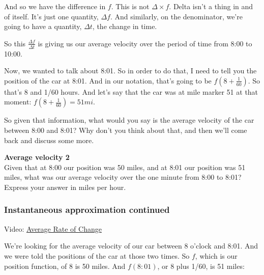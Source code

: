 \documentclass[pdftex, brazil, 12pt, twoside]{article}
\begin{document}
\begin{figure}[H]
  \begin{center}
  \end{center}
\end{figure}

And so we have the difference in $f$.
This is not $\Delta \times f$.
Delta isn't a thing in and of itself.
It's just one quantity, $\Delta f$.
And similarly, on the denominator,
we're going to have a quantity, $\Delta t$, the change in time.

So this $\displaystyle \frac{\Delta f}{\Delta t}$
is giving us our average velocity over the period
of time from 8:00 to 10:00.

Now, we wanted to talk about 8:01.
So in order to do that, I need to tell you the position
of the car at 8:01.
And in our notation, that's going to be $f(8 + \frac{1}{60})$.
So that's 8 and 1/60 hours.
And let's say that the car was at mile marker 51
at that moment: $f(8 + \frac{1}{60})=51 mi$.

So given that information, what would you say
is the average velocity of the car between 8:00 and 8:01?
Why don't you think about that, and then
we'll come back and discuss some more.

\begin{exercise}
  \textbf{Average velocity 2}\\%
  Given that at 8:00 our position was 50 miles,
  and at 8:01 our position was 51 miles, what was our average velocity over
  the one minute from 8:00 to 8:01? Express your answer in miles per hour.
\end{exercise}

\subsubsection{Instantaneous approximation continued}
\label{u1-what-inst-cont}

Video: \href{https://www.youtube.com/watch?v=d0OvM9uJ\_GY}{Average Rate of Change}

We're looking for the average velocity of our car
between 8 o'clock and 8:01.
And we were told the positions of the car at those two times.
So $f$, which is our position function, of 8 is 50 miles.
And $f(8:01)$, or 8 plus 1/60, is 51 miles:
\end{document}
